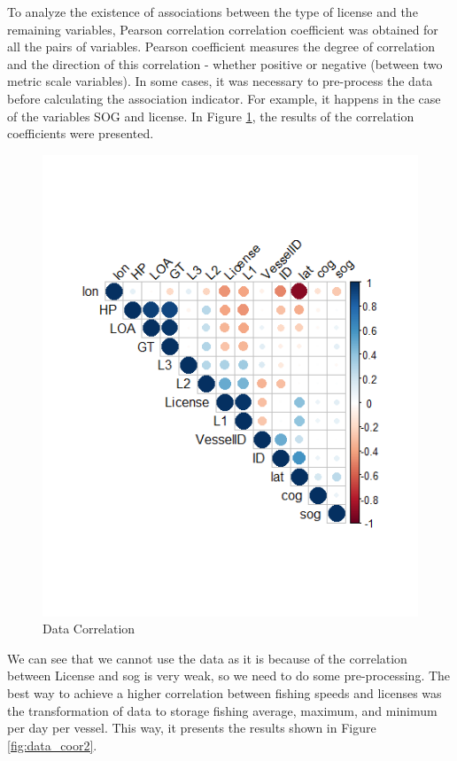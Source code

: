To analyze the existence of associations between the type of license and the remaining variables, Pearson correlation correlation coefficient was obtained for all the pairs of variables. Pearson coefficient \cite{Benesty2009} measures the degree of correlation and the direction of this correlation - whether positive or negative (between two metric scale variables). In some cases, it was necessary to pre-process the data before calculating the association indicator. For example, it happens in the case of the variables SOG and license. In Figure \ref{fig:data_coor1}, the results of the correlation coefficients were presented.
\begin{figure}
\centering
\includegraphics[width=0.7\linewidth]{Chapters/img/data_coor1.png}
\caption{Data Correlation}
\label{fig:data_coor1}
\end{figure}


We can see that we cannot use the data as it is because of the
correlation between License and sog is very weak, so we need to do some pre-processing.
The best way to achieve a higher correlation between fishing speeds and licenses was the transformation of data to storage fishing average, maximum, and minimum per day per vessel. This way, it presents the results shown in Figure \ref{fig:data_coor2}.

